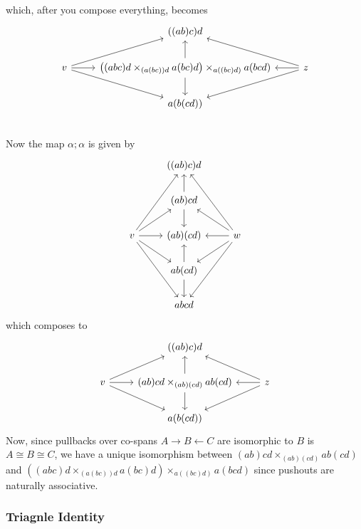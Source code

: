 \documentclass[12pt]{article}
\renewcommand{\(}{\left(}
\renewcommand{\)}{\right)}
\renewcommand{\{}{\left\lbrace}
\renewcommand{\}}{\right\rbrace}
\theoremstyle{remark}
\theoremstyle{definition}
\begin{document}
which, after you compose everything, becomes 
\[
	\begin{tikzcd}
		{} &
		{((ab)c)d} &
		{} \\
		{v} 
			\ar[ru]
			\ar[r]
			\ar[rd] &
		{\left( (abc)d \times_{(a(bc))d} a(bc)d \right) \times_{a((bc)d)} a(bcd) } 
			\ar[u]
			\ar[d]&
		{z} 
			\ar[lu]
			\ar[l]
			\ar[ld] \\
		{} &
		{a(b(cd))} &
		{} \\
	\end{tikzcd}
\]
Now the map $\alpha; \alpha$ is given by
\[
	\begin{tikzcd}
		{} &
		{((ab)c)d} &
		{} \\
		{} &
		{(ab)cd} 
			\ar[u]
			\ar[d] &
		{} \\
		{v} 
			\ar[ruu] 
			\ar[ru]
			\ar[r]
			\ar[rd]
			\ar[rdd] &
		{(ab)(cd)} &
		{w} 
			\ar[luu] 
			\ar[lu]
			\ar[l]
			\ar[ld]
			\ar[ldd]\\
		{} &
		{ab(cd)} 
			\ar[u]
			\ar[d] &
		{} \\
		{} &
		{abcd} &
		{}
	\end{tikzcd}
\]
which composes to
\[
	\begin{tikzcd}
		{} &
		{((ab)c)d} &
		{} \\
		{v} 
			\ar[ru]
			\ar[r]
			\ar[rd] &
		{(ab)cd \times_{(ab)(cd)} ab(cd)}
			\ar[u]
			\ar[d]&
		{z} 
			\ar[lu]
			\ar[l]
			\ar[ld] \\
		{} &
			{a(b(cd))} &
		{} 
	\end{tikzcd}
\]
Now, since pullbacks over co-spans $A \to B \leftarrow C$ are isomorphic to $B$ is $A \cong B \cong C$, we have a unique isomorphism between $(ab)cd \times_{(ab)(cd)} ab(cd)$ and $\left( (abc)d \times_{(a(bc))d} a(bc)d \right) \times_{a((bc)d)} a(bcd)$ since pushouts are naturally associative. 

\subsubsection*{Triagnle Identity}
\end{document}
